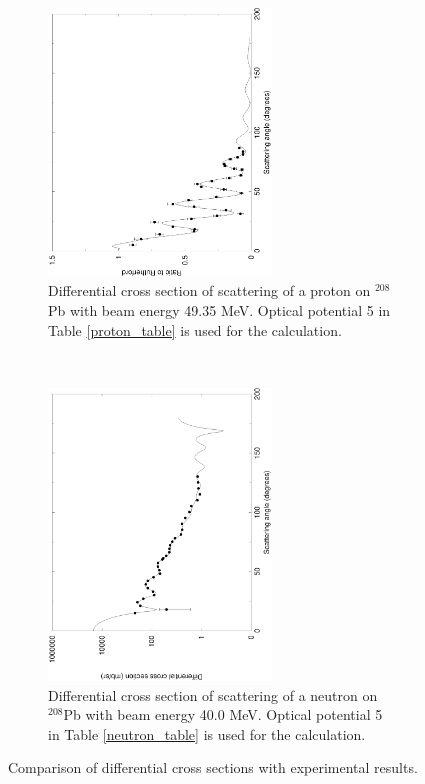 \begin{figure}[tb]
	\begin{subfigure}[tb]{0.5\textwidth}
		\centering
		\includegraphics[width=0.65\textwidth,angle=270]{proton_fit.eps}
		\caption{Differential cross section of scattering of a proton on $^{208}$Pb with beam energy 49.35 MeV. 
		Optical potential 5 in Table \ref{proton_table} is used for the calculation. }
		\label{fig:proton_fit}
	\end{subfigure}
~
	\begin{subfigure}[tb]{0.5\textwidth}
		\centering
		\includegraphics[width=0.65\textwidth,angle=270]{neutron_fit.eps}
		\caption{Differential cross section of scattering of a neutron on $^{208}$Pb with beam energy 40.0 MeV. 
			Optical potential 5 in Table \ref{neutron_table} is used for the calculation. }
		\label{fig:neutron_fit}
	\end{subfigure}
	\caption{Comparison of differential cross sections with experimental results. }
	\label{fig:bothfit}
\end{figure}

